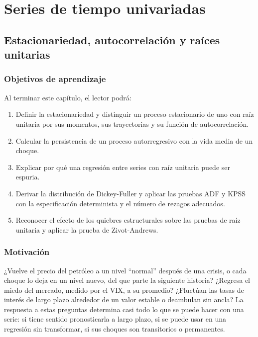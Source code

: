 \part{Series de tiempo univariadas}

\chapter[Estacionariedad y raíces unitarias]{Estacionariedad, autocorrelación y raíces unitarias}\label{cap:raiz}

\section*{Objetivos de aprendizaje}
Al terminar este capítulo, el lector podrá:
\begin{enumerate}[label=\arabic*.,leftmargin=*]
  \item Definir la estacionariedad y distinguir un proceso estacionario de uno con raíz unitaria por sus
        momentos, sus trayectorias y su función de autocorrelación.
  \item Calcular la persistencia de un proceso autorregresivo con la vida media de un choque.
  \item Explicar por qué una regresión entre series con raíz unitaria puede ser espuria.
  \item Derivar la distribución de Dickey-Fuller y aplicar las pruebas ADF y KPSS con la especificación
        determinista y el número de rezagos adecuados.
  \item Reconocer el efecto de los quiebres estructurales sobre las pruebas de raíz unitaria y aplicar la
        prueba de Zivot-Andrews.
\end{enumerate}

\section*{Motivación}
¿Vuelve el precio del petróleo a un nivel ``normal'' después de una crisis, o cada choque lo deja en un
nivel nuevo, del que parte la siguiente historia? ¿Regresa el miedo del mercado, medido por el VIX, a su
promedio? ¿Fluctúan las tasas de interés de largo plazo alrededor de un valor estable o deambulan sin
ancla? La respuesta a estas preguntas determina casi todo lo que se puede hacer con una serie: si tiene
sentido pronosticarla a largo plazo, si se puede usar en una regresión sin transformar, si sus choques
son transitorios o permanentes.

